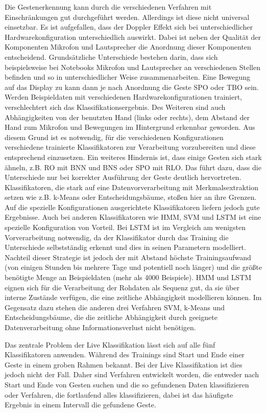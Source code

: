 Die Gestenerkennung kann durch die verschiedenen Verfahren mit Einschränkungen
gut durchgeführt werden. Allerdings ist diese nicht universal einsetzbar. Es ist
aufgefallen, dass der Doppler Effekt sich bei unterschiedlicher
Hardwarekonfiguration unterschiedlich auswirkt. Dabei ist neben der Qualität der
Komponenten Mikrofon und Lautsprecher die Anordnung dieser Komponenten
entscheidend. Grundsätzliche Unterschiede bestehen darin, dass sich
beispielsweise bei Notebooks Mikrofon und Lautsprecher an verschiedenen Stellen
befinden und so in unterschiedlicher Weise zusammenarbeiten. Eine Bewegung auf
das Display zu kann dann je nach Anordnung die Geste \acl{SPO} oder \acl{TBO}
sein. Werden Beispieldaten mit verschiedenen Hardwarekonfigurationen trainiert,
verschlechtert sich das Klassifikationsergebnis. Des Weiteren sind auch
Abhängigkeiten von der benutzten Hand (links oder rechts), dem Abstand der Hand
zum Mikrofon und Bewegungen im Hintergrund erkennbar geworden. Aus diesem Grund
ist es notwendig, für die verschiedenen Konfigurationen verschiedene trainierte
Klassifikatoren zur Verarbeitung vorzubereiten und diese entsprechend
einzusetzen. Ein weiteres Hindernis ist, dass einige Gesten sich stark ähneln,
z.B. \ac{RO} mit \ac{BNN} und \ac{BNS} oder \ac{SPO} mit \ac{RLO}. Das führt
dazu, dass die Unterschiede nur bei korrekter Ausführung der Geste deutlich
hervortreten.
Klassifikatoren, die stark auf eine Datenvorverarbeitung mit Merkmalsextraktion
setzen wie z.B. k-Means oder Entscheidungsbäume, stoßen hier an ihre Grenzen.
Auf die spezielle Konfigurationen ausgerichtete Klassifikatoren liefern jedoch
gute Ergebnisse. Auch bei anderen Klassifikatoren wie \ac{HMM}, \ac{SVM} und
\ac{LSTM} ist eine spezielle Konfiguration von Vorteil. Bei \ac{LSTM} ist im
Vergleich am wenigsten Vorverarbeitung notwendig, da der Klassifikator durch das
Training die Unterschiede selbstständig erkennt und dies in seinen Parametern
modelliert. Nachteil dieser Strategie ist jedoch der mit Abstand höchste
Trainingsaufwand (von einigen Stunden bis mehrere Tage und potentiell noch
länger) und die größte benötigte Menge an Beispieldaten (mehr als 4000
Beispiele). \ac{HMM} und \ac{LSTM} eignen sich für die Verarbeitung der Rohdaten
als Sequenz gut, da sie über interne Zustände verfügen, die eine zeitliche
Abhängigkeit modellieren können. Im Gegensatz dazu stehen die anderen drei
Verfahren \ac{SVM}, k-Means und Entscheidungsbäume, die die zeitliche
Abhängigkeit durch geeignete Datenverarbeitung ohne Informationsverlust nicht
benötigen.

Das zentrale Problem der Live Klassifikation lässt sich auf alle fünf
Klassifikatoren anwenden. Während des Trainings sind Start und Ende einer Geste
in einem groben Rahmen bekannt. Bei der Live Klassifikation ist dies jedoch
nicht der Fall. Daher sind Verfahren entwickelt worden, die entweder nach Start
und Ende von Gesten suchen und die so gefundenen Daten klassifizieren oder
Verfahren, die fortlaufend alles klassifizieren,
dabei ist das häufigste Ergebnis in einem Intervall die gefundene Geste.

